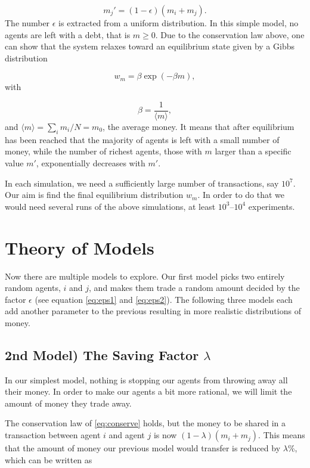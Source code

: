 \documentclass[12pt,a4paper]{article}
\begin{document}
\begin{equation}
  m_j'= (1-\epsilon)(m_i+m_j). \label{eq:eps2}
\end{equation}
The number $\epsilon$ is extracted from a uniform distribution.
In this simple model, no agents are left with a debt, that is $m\ge 0$.
Due to the conservation law above, one can show that the system relaxes toward an equilibrium
state given by a Gibbs distribution

\begin{equation*}
w_m=\beta \exp{(-\beta m)},
\end{equation*}
with

\begin{equation*}
\beta = \frac{1}{\langle m\rangle},
\end{equation*}
and $\langle m\rangle=\sum_i m_i/N=m_0$, the average money.
It means that after equilibrium has been reached that the majority of agents is left with a small
number of money, while the number of richest agents, those with $m$ larger than a specific value $m'$,
exponentially decreases with $m'$.

In each simulation, we need a sufficiently large number of transactions, say $10^7$. Our aim is find the final equilibrium distribution $w_m$. In order to do that we would need
several runs of the above simulations, at least $10^3$--$10^4$ experiments.

\section{Theory of Models}

Now there are multiple models to explore. Our first model picks two entirely random agents, $i$ and $j$, and makes them trade a random amount decided by the factor $\epsilon$ (see equation \eqref{eq:eps1} and \eqref{eq:eps2}).
The following three models each add another parameter to the previous resulting in more realistic distributions of money.
\subsection{2nd Model) The Saving Factor $\lambda$}
In our simplest model, nothing is stopping our agents from throwing away all their money. In order to make our agents a bit more rational, we will limit the amount of money they trade away.


The conservation law of \eqref{eq:conserve} holds, but the money to be shared in a transaction between
agent $i$ and agent $j$ is now $(1-\lambda)(m_i+m_j)$. This means that the amount of money our previous model would transfer is reduced by $\lambda$\%, which can be written as
\end{document}
